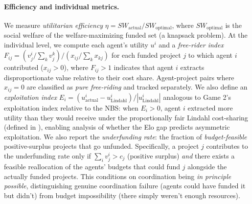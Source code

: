 \paragraph{Efficiency and individual metrics.}
We measure \emph{utilitarian efficiency} $\eta = SW_{\text{actual}} / SW_{\text{optimal}}$, where $SW_{\text{optimal}}$ is the social welfare of the welfare-maximizing funded set (a knapsack problem).
At the individual level, we compute each agent's utility $u^i$ and a \emph{free-rider index} $F_{ij} = (v^i_j / \sum_k v^k_j) / (x_{ij} / \sum_k x_{kj})$ for each funded project $j$ to which agent $i$ contributed ($x_{ij} > 0$), where $F_{ij} > 1$ indicates that agent $i$ extracts disproportionate value relative to their cost share.
Agent-project pairs where $x_{ij} = 0$ are classified as \emph{pure free-riding} and tracked separately.
We also define an \emph{exploitation index} $E_i = (u^i_{\text{actual}} - u^i_{\text{Lindahl}}) / |u^i_{\text{Lindahl}}|$ analogous to Game 2's exploitation index relative to the NBS: when $E_i > 0$, agent $i$ extracted more utility than they would receive under the proportionally fair Lindahl cost-sharing (defined in ), enabling analysis of whether the Elo gap predicts asymmetric exploitation.
We also report the \emph{underfunding rate}: the fraction of \emph{budget-feasible} positive-surplus projects that go unfunded.
Specifically, a project $j$ contributes to the underfunding rate only if $\sum_i v^i_j > c_j$ (positive surplus) \emph{and} there exists a feasible reallocation of the agents' budgets that could fund $j$ alongside the actually funded projects.
This conditions on coordination being \emph{in principle possible}, distinguishing genuine coordination failure (agents could have funded it but didn't) from budget impossibility (there simply weren't enough resources).

